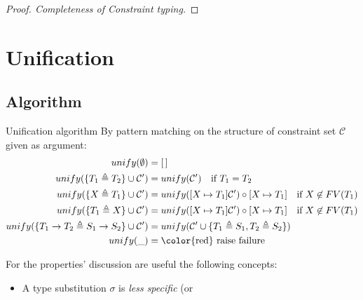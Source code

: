 \documentclass[8pt]{beamer}
\begin{document}
\begin{frame}
    \begin{proof}[Proof. Completeness of Constraint typing]
    \end{proof}
\end{frame}

\section{Unification}
\subsection{Algorithm}
\begin{frame}
    \begin{block}{Unification algorithm}
        By pattern matching on the structure of constraint set $\mathcal{C}$
        given as argument:
        \begin{displaymath}
            \begin{split}
                unify(\emptyset) &= [\,] \\
                unify(\{T_1 \triangleq T_2\} \cup \mathcal{C}^{\prime}) &=
                    unify(\mathcal{C}^{\prime})
                    \quad \text{if } T_1 = T_2\\
                unify(\{X \triangleq T_1\} \cup \mathcal{C}^{\prime}) &=
                    unify([ X \mapsto T_1]\mathcal{C}^{\prime}) \circ [X \mapsto T_1]
                    \quad \text{if } X \not \in FV(T_1)\\
                unify(\{T_1 \triangleq X\} \cup \mathcal{C}^{\prime}) &=
                    unify([ X \mapsto T_1]\mathcal{C}^{\prime}) \circ [X \mapsto T_1]
                    \quad \text{if } X \not \in FV(T_1)\\
                unify(\{T_1 \rightarrow T_2 \triangleq S_1\rightarrow S_2 \} 
                    \cup \mathcal{C}^{\prime}) &=
                    unify(\mathcal{C}^{\prime} \cup \{T_1 \triangleq S_1,
                        T_2 \triangleq S_2\}) \\
                unify(\_) &= \text{\color{red} raise failure}\\
            \end{split}
        \end{displaymath}
    \end{block}
    \pause
    For the properties' discussion are useful the following concepts:
    \begin{itemize}
        \item   A type substitution $\sigma$ is \emph{less specific} (or 

\end{itemize}
\end{frame}
\end{document}
